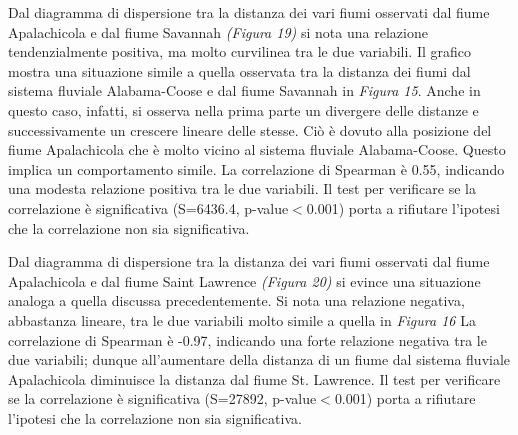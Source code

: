 \documentclass{article} %
\begin{document}
Dal diagramma di dispersione tra la distanza dei vari fiumi osservati dal fiume Apalachicola e dal fiume Savannah \textit{(Figura 19)} si nota una relazione tendenzialmente positiva, ma molto curvilinea tra le due variabili. 
Il grafico mostra una situazione simile a quella osservata tra la distanza dei fiumi dal sistema fluviale Alabama-Coose e dal fiume Savannah in \textit{Figura 15}. Anche in questo caso, infatti, si osserva nella prima parte un divergere delle distanze e successivamente un crescere lineare delle stesse. 
Ciò è dovuto alla posizione del fiume Apalachicola che è molto vicino al sistema fluviale Alabama-Coose. Questo implica un comportamento simile.
La correlazione di Spearman è 0.55, indicando una modesta relazione positiva tra le due variabili.  
Il test per verificare se la correlazione è significativa (S=6436.4, p-value$<$0.001) porta a rifiutare l'ipotesi che la correlazione non sia significativa.

Dal diagramma di dispersione tra la distanza dei vari fiumi osservati dal fiume Apalachicola e dal fiume Saint Lawrence \textit{(Figura 20)} si evince una situazione analoga a quella discussa precedentemente.
Si nota una relazione negativa, abbastanza lineare, tra le due variabili molto simile a quella in \textit{Figura 16}
La correlazione di Spearman è -0.97, indicando una forte relazione negativa tra le due variabili; dunque all'aumentare della distanza di un fiume dal sistema fluviale Apalachicola diminuisce la distanza dal fiume St. Lawrence. 
Il test per verificare se la correlazione è significativa (S=27892, p-value$<$0.001) porta a rifiutare l'ipotesi che la correlazione non sia significativa.
\end{document}
